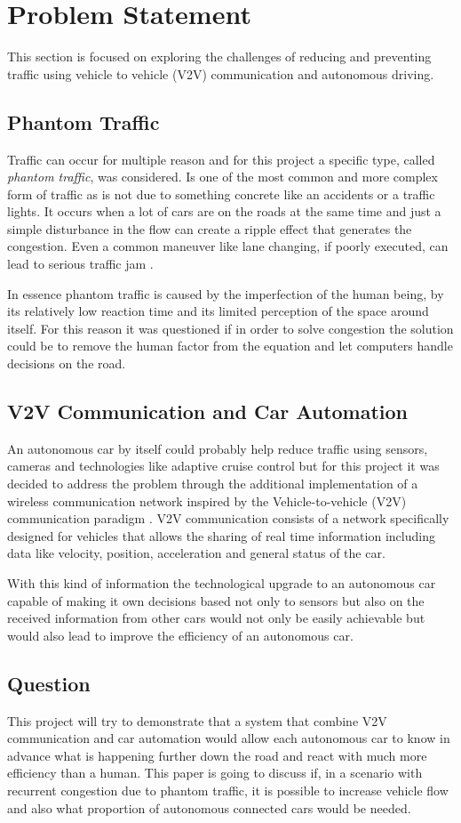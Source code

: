 \section{Problem Statement}
\label{sec:problem-statement}
This section is focused on exploring the challenges of reducing and preventing traffic using vehicle to vehicle (V2V) communication and autonomous driving.
\subsection{Phantom Traffic}
Traffic can occur for multiple reason and for this project a specific type, called \textit{phantom traffic}, was considered. Is one of the most common and more complex form of traffic as is not due to something concrete like an accidents or a traffic lights. It occurs when a lot of cars are on the roads at the same time and just a simple disturbance in the flow can create a ripple effect that generates the congestion. Even a common maneuver like lane changing, if poorly executed, can lead to serious traffic jam \cite{Phantom}.

In essence phantom traffic is caused by the imperfection of the human being, by its relatively low reaction time and its limited perception of the space around itself. For this reason it was questioned if in order to solve congestion the solution could be to remove the human factor from the equation and let computers handle decisions on the road.
\subsection{V2V Communication and Car Automation}
An autonomous car by itself could probably help reduce traffic using sensors, cameras and technologies like adaptive cruise control\cite{ACC} but for this project it was decided to address the problem through the additional implementation of a wireless communication network inspired by the Vehicle-to-vehicle (V2V) communication paradigm \cite{V2V}. V2V communication consists of a network specifically designed for vehicles that allows the sharing of real time information including data like velocity, position, acceleration and general status of the car. 

With this kind of information the technological upgrade to an autonomous car capable of making it own decisions based not only to sensors but also on the received information from other cars would not only be easily achievable but would also lead to improve the efficiency of an autonomous car\cite{V2Vimprovement}. 

\subsection{Question}
This project will try to demonstrate that a system that combine V2V communication and car automation would allow each autonomous car to know in advance what is happening further down the road and react with much more efficiency than a human. This paper is going to discuss if, in a scenario with recurrent congestion due to phantom traffic, it is possible to increase vehicle flow and also what proportion of autonomous connected cars would be needed.




